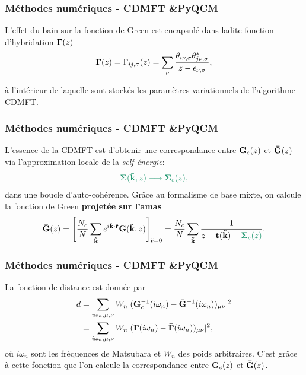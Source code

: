 \begin{frame}
  \frametitle{Méthodes numériques - CDMFT \&\;PyQCM}
  L'effet du bain sur la fonction de Green est encapsulé dans ladite
  \textcolor{vibrant_green}{fonction d'hybridation $\vb{\Gamma}(z)$}
  \vspace{1cm}
  \begin{align}
    \vb{\Gamma}(z) = \Gamma_{ij,\sigma}(z) = \sum_\nu\frac{\theta_{i\nu,\sigma}\theta^*_{j\nu,\sigma}}{z - \epsilon_{\nu,\sigma}},
    \label{eq: hybridization}
  \end{align}
  \vspace{1cm}

  à l'intérieur de laquelle sont stockés les paramètres variationnels de l'algorithme CDMFT.
\end{frame}

\begin{frame}
  \frametitle{Méthodes numériques - CDMFT \&\;PyQCM}
    L'essence de la CDMFT est d'obtenir une correspondance entre
    $\vb{G}_c(z)$ et $\vb{\Bar{G}}(z)$ via \textcolor{vibrant_green}{l'approximation locale de la \textit{self-énergie}:}
    \begin{align}
        \textcolor{vibrant_green}
        {\vb{\Sigma}(\vb{\tilde{k}}, z)\longrightarrow\vb{\Sigma}_c(z),}
    \end{align}
    dans une boucle d'auto-cohérence.
    \vfill
    \pause
    Grâce au formalisme de base mixte, on calcule la fonction de Green
    \textbf{projetée sur l'amas}
    \begin{align}
        \vb{\Bar{G}}(z) = \Bigg[\frac{N_c}{N}\sum_{\vb{\Tilde{k}}}e^{i\vb{\Tilde{k}}\cdot\vb{\Tilde{r}}}\vb{G}(\vb{\Tilde{k}}, z)\Bigg]_{\vb{\Tilde{r}}=0}
        = \frac{N_c}{N}\sum_{\vb{\tilde{k}}}\frac{1}{z - \vb{t}(\vb{\tilde{k}}) - \textcolor{vibrant_green}{\vb{\Sigma}_c(z)}}.
    \end{align}
\end{frame}

\begin{frame}
  \frametitle{Méthodes numériques - CDMFT \&\;PyQCM}
    La fonction de distance est donnée par
    \begin{align}
      d &= \sum_{i\omega_n, \mu, \nu}W_n|(\vb{G}_c^{-1}(i\omega_n) - \vb{\Bar{G}}^{-1}(i\omega_n))_{\mu\nu}|^2 \\
        &=\sum_{i\omega_n, \mu, \nu}W_n|(\vb{\Gamma}(i\omega_n) - \vb{\Bar{\Gamma}}(i\omega_n))_{\mu\nu}|^2,
        \label{eq: dist}
    \end{align}
    où $i\omega_n$ sont les fréquences de Matsubara et $W_n$ des poids arbitraires.
    C'est grâce à cette fonction que l'on calcule la correspondance entre $\vb{G}_c(z)$ et $\vb{\Bar{G}}(z)$.
\end{frame}

